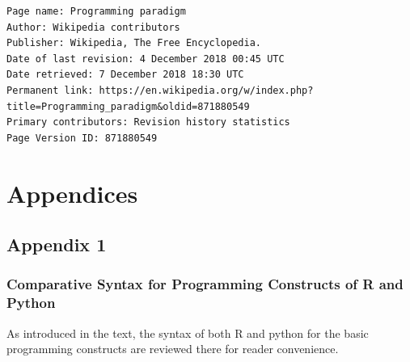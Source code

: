 \documentclass[]{book}
\theoremstyle{definition}
\theoremstyle{definition}
\theoremstyle{definition}
\theoremstyle{remark}
\begin{document}
\begin{verbatim}
Page name: Programming paradigm
Author: Wikipedia contributors
Publisher: Wikipedia, The Free Encyclopedia.
Date of last revision: 4 December 2018 00:45 UTC
Date retrieved: 7 December 2018 18:30 UTC
Permanent link: https://en.wikipedia.org/w/index.php?title=Programming_paradigm&oldid=871880549
Primary contributors: Revision history statistics
Page Version ID: 871880549
\end{verbatim}

\part{Appendices}\label{part-appendices}

\chapter{Appendix 1}\label{appendix-1}

\section{Comparative Syntax for Programming Constructs of R and
Python}\label{comparative-syntax-for-programming-constructs-of-r-and-python}

As introduced in the text, the syntax of both R and python for the basic
programming constructs are reviewed there for reader convenience.
\end{document}
